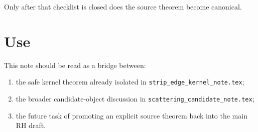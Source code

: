 \documentclass[11pt]{article}
\begin{document}
Only after that checklist is closed does the source theorem become canonical.

\section{Use}

This note should be read as a bridge between:

\begin{enumerate}
\item the safe kernel theorem already isolated in \texttt{strip_edge_kernel_note.tex};
\item the broader candidate-object discussion in \texttt{scattering_candidate_note.tex};
\item the future task of promoting an explicit source theorem back into the main
RH draft.
\end{enumerate}
\end{document}
